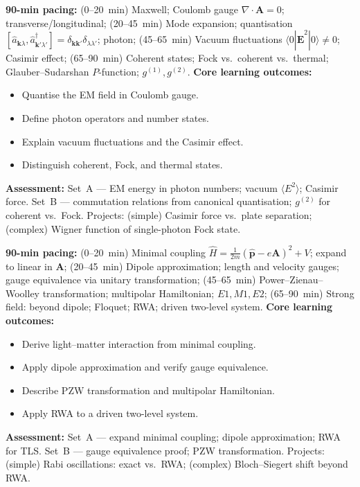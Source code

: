 \documentclass[11pt,a4paper]{article}
\begin{document}
\begin{tcolorbox}[modulebox, title={Module~II.6 / L01: Classical and Quantum Electromagnetic Fields}]
\textbf{90-min pacing:} (0--20~min) Maxwell; Coulomb gauge $\nabla\cdot\mathbf{A}=0$; transverse/longitudinal; (20--45~min) Mode expansion; quantisation $[\hat{a}_{\mathbf{k}\lambda},\hat{a}^\dagger_{\mathbf{k}'\lambda'}]=\delta_{\mathbf{k}\mathbf{k}'}\delta_{\lambda\lambda'}$; photon; (45--65~min) Vacuum fluctuations $\langle0|\hat{\mathbf{E}}^2|0\rangle\neq0$; Casimir effect; (65--90~min) Coherent states; Fock vs.\ coherent vs.\ thermal; Glauber--Sudarshan $P$-function; $g^{(1)},g^{(2)}$.
\medskip\textbf{Core learning outcomes:}
\begin{itemize}[leftmargin=1.4em,topsep=2pt,itemsep=1pt]
  \item Quantise the EM field in Coulomb gauge.
  \item Define photon operators and number states.
  \item Explain vacuum fluctuations and the Casimir effect.
  \item Distinguish coherent, Fock, and thermal states.
\end{itemize}
\medskip\textbf{Assessment:}
Set~A --- EM energy in photon numbers; vacuum $\langle E^2\rangle$; Casimir force.
Set~B --- commutation relations from canonical quantisation; $g^{(2)}$ for coherent vs.\ Fock.
Projects: (simple) Casimir force vs.\ plate separation; (complex) Wigner function of single-photon Fock state.
\end{tcolorbox}

\medskip

\begin{tcolorbox}[modulebox, title={Module~II.6 / L02: Light--Matter Coupling}]
\textbf{90-min pacing:} (0--20~min) Minimal coupling $\hat{H}=\tfrac{1}{2m}(\hat{\mathbf{p}}-e\mathbf{A})^2+V$; expand to linear in $\mathbf{A}$; (20--45~min) Dipole approximation; length and velocity gauges; gauge equivalence via unitary transformation; (45--65~min) Power--Zienau--Woolley transformation; multipolar Hamiltonian; $E1,M1,E2$; (65--90~min) Strong field: beyond dipole; Floquet; RWA; driven two-level system.
\medskip\textbf{Core learning outcomes:}
\begin{itemize}[leftmargin=1.4em,topsep=2pt,itemsep=1pt]
  \item Derive light--matter interaction from minimal coupling.
  \item Apply dipole approximation and verify gauge equivalence.
  \item Describe PZW transformation and multipolar Hamiltonian.
  \item Apply RWA to a driven two-level system.
\end{itemize}
\medskip\textbf{Assessment:}
Set~A --- expand minimal coupling; dipole approximation; RWA for TLS.
Set~B --- gauge equivalence proof; PZW transformation.
Projects: (simple) Rabi oscillations: exact vs.\ RWA; (complex) Bloch--Siegert shift beyond RWA.
\end{tcolorbox}
\end{document}

